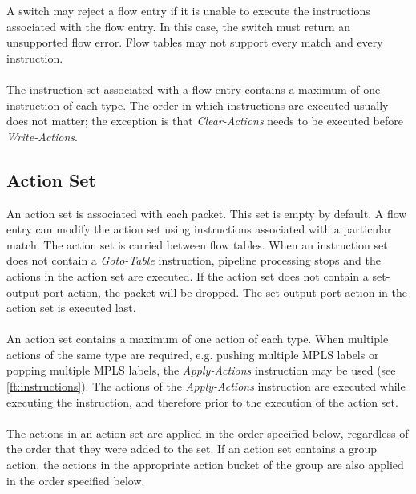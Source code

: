\documentclass[10pt]{article}
\begin{document}
A switch may reject a flow entry if it is unable to execute the instructions associated with the flow entry. In this case, the switch must return an unsupported flow error.  Flow tables may not support every match and every instruction.
\\\\
The instruction set associated with a flow entry contains a maximum of one instruction of each type. The order in which instructions are executed usually does not matter; the exception is that \emph{Clear-Actions} needs to be executed before \emph{Write-Actions}.

\subsection{Action Set}
\label{ft:actionset}
An action set is associated with each packet. This set is empty by default. A flow entry can modify the action set using instructions associated with a particular match. The action set is carried between flow tables. When an instruction set does not contain a \textit{Goto-Table} instruction, pipeline processing stops and the actions in the action set are executed. If the action set does not contain a set-output-port action, the packet will be dropped. The set-output-port action in the action set is executed last.
\\\\
An action set contains a maximum of one action of each type. When multiple actions of the same type are required, e.g. pushing multiple MPLS labels or popping multiple MPLS labels, the \emph{Apply-Actions} instruction may be used (see \ref{ft:instructions}). The actions of the \emph{Apply-Actions} instruction are executed while executing the instruction, and therefore prior to the execution of the action set.
\\\\
The actions in an action set are applied in the order specified below, regardless of the order that they were added to the set. If an action set contains a group action, the actions in the appropriate action bucket of the group are also applied in the order specified below.
\end{document}
